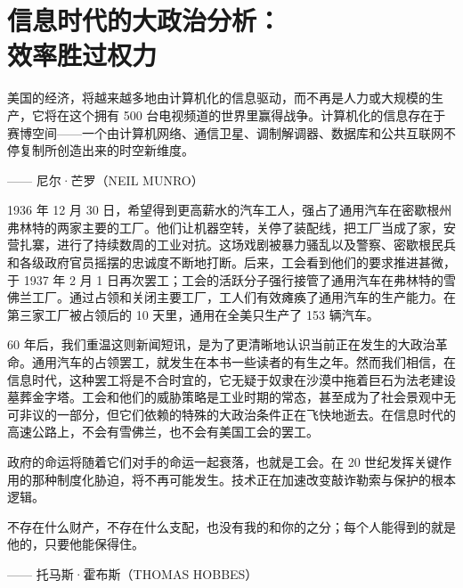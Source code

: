 \chapter[信息时代的大政治分析]{信息时代的大政治分析：\\ 效率胜过权力}

\begin{tcolorbox}
美国的经济，将越来越多地由计算机化的信息驱动，而不再是人力或大规模的生产，它将在这个拥有 500 台电视频道的世界里赢得战争。计算机化的信息存在于赛博空间——一个由计算机网络、通信卫星、调制解调器、数据库和公共互联网不停复制所创造出来的时空新维度。
\begin{flushright}
—— 尼尔·芒罗（NEIL MUNRO）
\end{flushright}
\end{tcolorbox}

1936 年 12 月 30 日，希望得到更高薪水的汽车工人，强占了通用汽车在密歇根州弗林特的两家主要的工厂。他们让机器空转，关停了装配线，把工厂当成了家，安营扎寨，进行了持续数周的工业对抗。这场戏剧被暴力骚乱以及警察、密歇根民兵和各级政府官员摇摆的忠诚度不断地打断。后来，工会看到他们的要求推进甚微，于 1937 年 2 月 1 日再次罢工；工会的活跃分子强行接管了通用汽车在弗林特的雪佛兰工厂。通过占领和关闭主要工厂，工人们有效瘫痪了通用汽车的生产能力。在第三家工厂被占领后的 10 天里，通用在全美只生产了 153 辆汽车。

60 年后，我们重温这则新闻短讯，是为了更清晰地认识当前正在发生的大政治革命。通用汽车的占领罢工，就发生在本书一些读者的有生之年。然而我们相信，在信息时代，这种罢工将是不合时宜的，它无疑于奴隶在沙漠中拖着巨石为法老建设墓葬金字塔。工会和他们的威胁策略是工业时期的常态，甚至成为了社会景观中无可非议的一部分，但它们依赖的特殊的大政治条件正在飞快地逝去。在信息时代的高速公路上，不会有雪佛兰，也不会有美国工会的罢工。

政府的命运将随着它们对手的命运一起衰落，也就是工会。在 20 世纪发挥关键作用的那种制度化胁迫，将不再可能发生。技术正在加速改变敲诈勒索与保护的根本逻辑。

\begin{tcolorbox}
不存在什么财产，不存在什么支配，也没有我的和你的之分；每个人能得到的就是他的，只要他能保得住。
\begin{flushright}
—— 托马斯·霍布斯（THOMAS HOBBES）    
\end{flushright} 
\end{tcolorbox}



